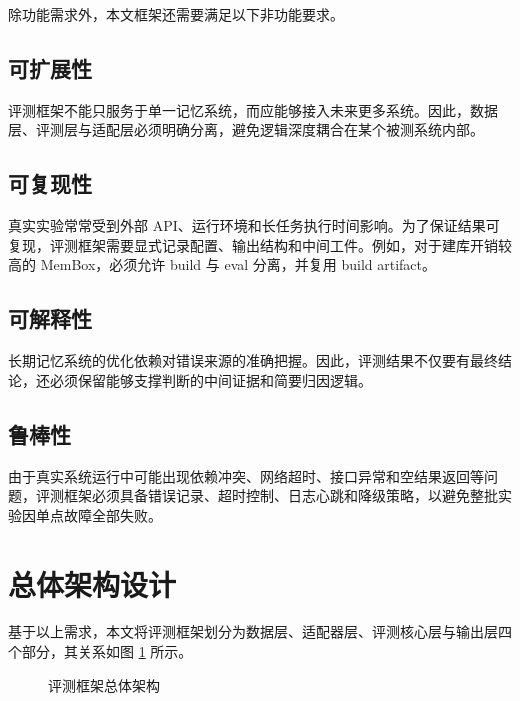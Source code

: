 除功能需求外，本文框架还需要满足以下非功能要求。

\subsection{可扩展性}

评测框架不能只服务于单一记忆系统，而应能够接入未来更多系统。因此，数据层、评测层与适配层必须明确分离，避免逻辑深度耦合在某个被测系统内部。

\subsection{可复现性}

真实实验常常受到外部 API、运行环境和长任务执行时间影响。为了保证结果可复现，评测框架需要显式记录配置、输出结构和中间工件。例如，对于建库开销较高的 MemBox，必须允许 build 与 eval 分离，并复用 build artifact。

\subsection{可解释性}

长期记忆系统的优化依赖对错误来源的准确把握。因此，评测结果不仅要有最终结论，还必须保留能够支撑判断的中间证据和简要归因逻辑。

\subsection{鲁棒性}

由于真实系统运行中可能出现依赖冲突、网络超时、接口异常和空结果返回等问题，评测框架必须具备错误记录、超时控制、日志心跳和降级策略，以避免整批实验因单点故障全部失败。

\section{总体架构设计}

基于以上需求，本文将评测框架划分为数据层、适配器层、评测核心层与输出层四个部分，其关系如图 \ref{fig:overall-arch} 所示。

\begin{figure}[htbp]
\centering
{}
\caption{评测框架总体架构}
\label{fig:overall-arch}
\end{figure}

